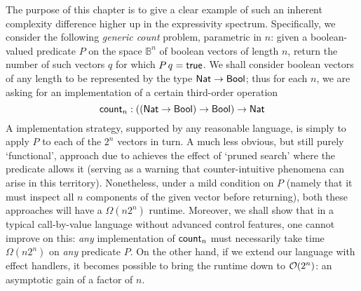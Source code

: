 \documentclass[12pt,phd,lfcs,twoside,openright,logo,leftchapter,normalheadings]{infthesis}
\theoremstyle{plain}
\theoremstyle{definition}
\begin{document}

The purpose of this chapter is to give a clear example of such an
inherent complexity difference higher up in the expressivity spectrum.
Specifically, we consider the following \emph{generic count} problem,
parametric in $n$: given a boolean-valued predicate $P$ on the space
${\mathbb B}^n$ of boolean vectors of length $n$, return the number of
such vectors $q$ for which $P\,q = \mathsf{true}$.  We shall consider boolean
vectors of any length to be represented by the type $\mathsf{Nat} \to \mathsf{Bool}$;
thus for each $n$, we are asking for an implementation of a certain
third-order operation
%
\[ \mathsf{count}_n : ((\mathsf{Nat} \to \mathsf{Bool}) \to \mathsf{Bool}) \to \mathsf{Nat}  \]
%
A \naive implementation strategy, supported by any reasonable
language, is simply to apply $P$ to each of the $2^n$ vectors in turn.
A much less obvious, but still purely `functional', approach due to
\citet{Berger90} achieves the effect of `pruned search' where the
predicate allows it (serving as a warning that counter-intuitive
phenomena can arise in this territory).  Nonetheless, under a mild
condition on $P$ (namely that it must inspect all $n$ components of
the given vector before returning), both these approaches will have a
$\Omega(n 2^n)$ runtime.  Moreover, we shall show that in a typical
call-by-value language without advanced control features, one cannot
improve on this: \emph{any} implementation of $\mathsf{count}_n$ must
necessarily take time $\Omega(n2^n)$ on \emph{any} predicate $P$.  On
the other hand, if we extend our language with effect handlers, it
becomes possible to bring the runtime down to $\mathcal{O}(2^n)$: an
asymptotic gain of a factor of $n$.
\end{document}
